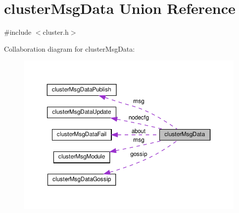 \hypertarget{unioncluster_msg_data}{}\section{cluster\+Msg\+Data Union Reference}
\label{unioncluster_msg_data}


{\ttfamily \#include $<$cluster.\+h$>$}



Collaboration diagram for cluster\+Msg\+Data\+:
\nopagebreak
\begin{figure}[H]
\begin{center}
\leavevmode
\includegraphics[width=350pt]{unioncluster_msg_data__coll__graph}
\end{center}
\end{figure}
